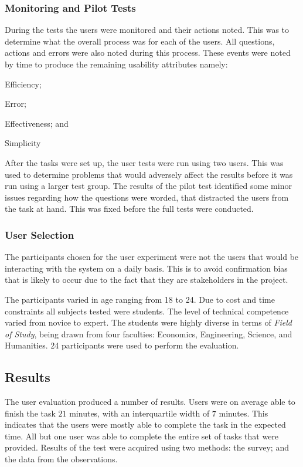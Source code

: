 \subsubsection{Monitoring and Pilot Tests}
During the tests the users were monitored and their actions noted. This was to
determine what the overall process was for each of the users. All
questions, actions and errors were also noted during this process. These events
were noted by time to produce the remaining usability attributes namely:
\begin{inparaenum}[(i)]\item Efficiency; \item Error; \item Effectiveness; and \item
Simplicity  \end{inparaenum}

After the tasks were set up, the user tests were run using two users. This was
used to determine problems that would adversely affect the results before it was
run using a larger test group. The results of the pilot test identified some
minor issues regarding how the questions were worded, that distracted the users
from the task at hand. This was fixed before the full tests were conducted.

\subsubsection{User Selection}
The participants chosen for the user experiment were not the users that would
be interacting with the system on a daily basis. This is to avoid confirmation
bias that is likely to occur due to the fact that they are stakeholders in the
project\cite{kaptchuk2003effect}. 

The participants varied in age ranging from 18 to 24. Due to cost and time
constraints all subjects tested were students. The level of
technical competence varied from novice to expert. The students were highly
diverse in terms of \emph{Field of Study}, being drawn from four faculties:
Economics, Engineering, Science, and Humanities. 24 participants were used 
to perform the evaluation.

\subsection{Results}
The user evaluation produced a number of results. Users were on average able to
finish the task $21$ minutes, with an interquartile width of
$7$ minutes. This indicates that the users were mostly able to complete the task
in the expected time. All but one user was able to complete the
entire set of tasks that were provided. Results of the test were acquired using two
methods: the survey; and the data from the observations.

